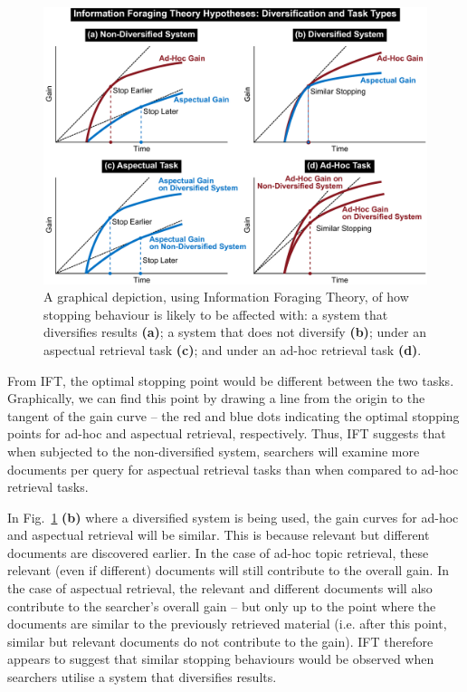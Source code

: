 \begin{figure}[t!]
\begin{center}
        \includegraphics[width=\textwidth]{figures/ift-non-div-fromthesis.pdf}
        \vspace{-2mm}
    \caption{A graphical depiction, using Information Foraging Theory, of how stopping behaviour is likely to be affected with: a system that diversifies results \textbf{(a)}; a system that does not diversify \textbf{(b)}; under an aspectual retrieval task \textbf{(c)}; and under an ad-hoc retrieval task \textbf{(d)}.} \label{fig_ift_patches}    
    \vspace{-6mm}
\end{center}
\end{figure}


From IFT, the optimal stopping point would be different between the two tasks. Graphically, we can find this point by drawing a line from the origin to the tangent of the gain curve -- the red and blue dots indicating the optimal stopping points for ad-hoc and aspectual retrieval, respectively. Thus, IFT suggests that when subjected to the non-diversified system, searchers will examine more documents per query for aspectual retrieval tasks than when compared to ad-hoc retrieval tasks.

In Fig.~\ref{fig_ift_patches} \textbf{(b)} where a diversified system is being used, the gain curves for ad-hoc and aspectual retrieval will be similar. This is because relevant but different documents are discovered earlier. In the case of ad-hoc topic retrieval, these relevant (even if different) documents will still contribute to the overall gain. In the case of aspectual retrieval, the relevant and different documents will also contribute to the searcher's overall gain -- but only up to the point where the documents are similar to the previously retrieved material (i.e. after this point, similar but relevant documents do not contribute to the gain). IFT therefore appears to suggest that similar stopping behaviours would be observed when searchers utilise a system that diversifies results.

